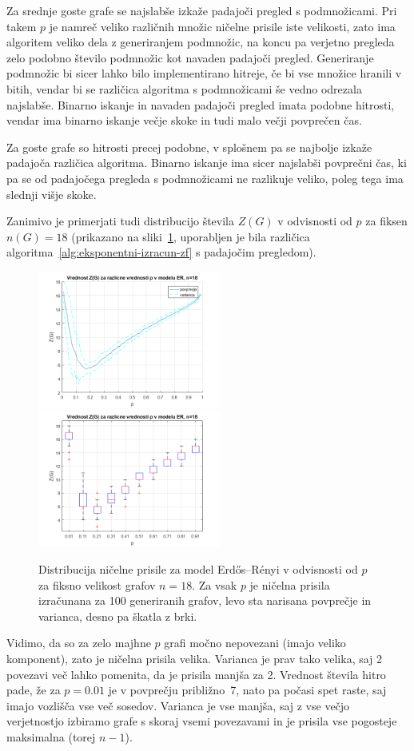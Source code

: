 \documentclass[12pt,a4paper,twoside]{article}
\theoremstyle{definition} %
\theoremstyle{plain} %
\numberwithin{equation}{section}  %
\begin{document}
Za srednje goste grafe se najslabše izkaže padajoči pregled s podmnožicami. Pri takem $p$ je namreč veliko različnih množic ničelne prisile iste velikosti, zato ima algoritem veliko dela z generiranjem podmnožic, na koncu pa verjetno pregleda zelo podobno število podmnožic kot navaden padajoči pregled. Generiranje podmnožic bi sicer lahko bilo implementirano hitreje, če bi vse množice hranili v bitih, vendar bi se različica algoritma s podmnožicami še vedno odrezala najslabše. Binarno iskanje in navaden padajoči pregled imata podobne hitrosti, vendar ima binarno iskanje večje skoke in tudi malo večji povprečen čas. 

Za goste grafe so hitrosti precej podobne, v splošnem pa se najbolje izkaže padajoča različica algoritma. Binarno iskanje ima sicer najslabši povprečni čas, ki pa se od padajočega pregleda s podmnožicami ne razlikuje veliko, poleg tega ima slednji višje skoke. 

Zanimivo je primerjati tudi distribucijo števila $Z(G)$ v odvisnosti od $p$ za fiksen $n(G) = 18$ (prikazano na sliki~\ref{fig:er-random-18}, uporabljen je bila različica algoritma~\ref{alg:eksponentni-izracun-zf} s padajočim pregledom).
\begin{figure}[h]
     \centering
     \includegraphics[width=170pt]{koda/results/plots/er_zfn_dist_18_avg.png}
     \includegraphics[width=170pt]{koda/results/plots/er_zfn_dist_18_boxplot.png}
     \caption{Distribucija ničelne prisile za model Erdős–Rényi v odvisnosti od $p$ za fiksno velikost grafov $n=18$. Za vsak $p$ je ničelna prisila izračunana za 100 generiranih grafov, levo sta narisana povprečje in varianca, desno pa škatla z brki.}
     \label{fig:er-random-18}
\end{figure}
Vidimo, da so za zelo majhne $p$ grafi močno nepovezani (imajo veliko komponent), zato je ničelna prisila velika. Varianca je prav tako velika, saj 2 povezavi več lahko pomenita, da je prisila manjša za 2. Vrednost števila hitro pade, že za $p=0.01$ je v povprečju približno~7, nato pa počasi spet raste, saj imajo vozlišča vse več sosedov. Varianca je vse manjša, saj z vse večjo verjetnostjo izbiramo grafe s skoraj vsemi povezavami in je prisila vse pogosteje maksimalna (torej $n-1$).
\end{document}
